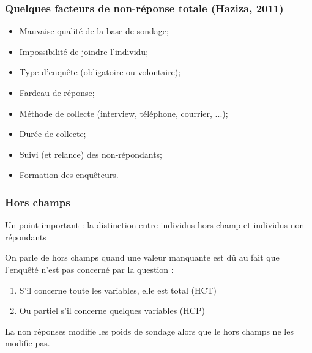 \begin{frame}
	\frametitle{Quelques facteurs de non-réponse totale (Haziza, 2011)}
	
\begin{itemize}
	\item Mauvaise qualité de la base de sondage;
	\item Impossibilité de joindre l’individu;
	\item Type d’enquête (obligatoire ou volontaire);
	\item Fardeau de réponse;
	\item Méthode de collecte (interview, téléphone, courrier, ...);
	\item Durée de collecte;
	\item Suivi (et relance) des non-répondants;
    \item Formation des enquêteurs.
\end{itemize}

\end{frame}



\begin{frame}
	\frametitle{Hors champs}
	
Un point important : la distinction entre individus hors-champ et individus non-répondants \\ \vspace{0.4cm}


On parle de hors champs quand une valeur manquante est dû au fait que l’enquêté n’est pas concerné par la question : \\ \vspace{0.4cm}

\begin{enumerate}
	\item S'il concerne toute les variables, elle est total (HCT) 
	\item Ou partiel s’il concerne quelques variables (HCP) 
\end{enumerate} 

 \vspace{0.3cm}
La non réponses modifie les poids de sondage alors que le hors champs ne les modifie pas.
\end{frame}








